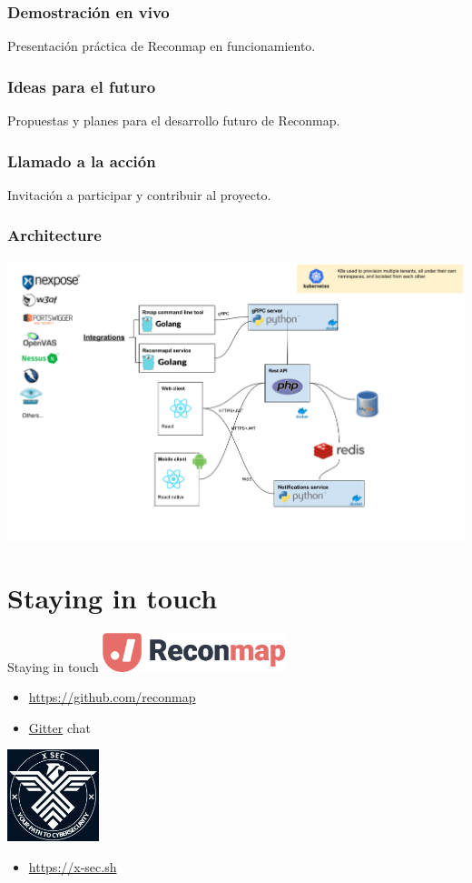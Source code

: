 \documentclass{beamer}
\begin{document}
\begin{frame}
	\frametitle{Demostración en vivo}
	Presentación práctica de Reconmap en funcionamiento.
\end{frame}

\begin{frame}
	\frametitle{Ideas para el futuro}
	Propuestas y planes para el desarrollo futuro de Reconmap.
\end{frame}

\begin{frame}
	\frametitle{Llamado a la acción}
	Invitación a participar y contribuir al proyecto.
\end{frame}


\begin{frame}
	\frametitle{Architecture}

	\includegraphics[width=\textwidth]{images/reconmap-architecture.png}
\end{frame}

\section{Staying in touch}

\begin{frame}{Staying in touch}
	\includegraphics[width=0.4\textwidth]{images/reconmap-logo.png}
	\begin{itemize}
		\item \href{https://github.com/reconmap}{https://github.com/reconmap}
		\item \href{https://gitter.im/reconmap/community}{Gitter} chat
	\end{itemize}
	\bigskip

	\includegraphics[width=0.2\textwidth]{images/xsec_logo.jpeg}
	\begin{itemize}
		\item \url{https://x-sec.sh}
	\end{itemize}
\end{frame}
\end{document}
